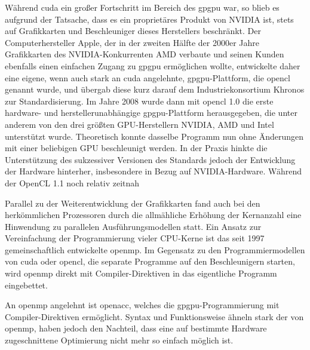 Während \gls{cuda} ein großer Fortschritt im Bereich des \gls{gpgpu} war, so blieb es aufgrund der Tatsache, dass es
ein proprietäres Produkt von NVIDIA{\textregistered} ist, stets auf Grafikkarten und Beschleuniger dieses Herstellers
beschränkt. Der Computerhersteller Apple{\textregistered}, der in der zweiten Hälfte der 2000er Jahre Grafikkarten des
NVIDIA{\textregistered}-Konkurrenten AMD verbaute und seinen Kunden ebenfalls einen einfachen Zugang zu
\gls{gpgpu} ermöglichen wollte, entwickelte daher eine eigene, wenn auch stark an \gls{cuda} angelehnte,
\gls{gpgpu}-Plattform, die \gls{opencl} genannt wurde, und übergab diese kurz darauf dem Industriekonsortium Khronos zur
Standardisierung. Im Jahre 2008 wurde dann mit \gls{opencl} 1.0 die erste hardware- und herstellerunabhängige
\gls{gpgpu}-Plattform herausgegeben, die unter anderem von den drei größten GPU-Herstellern NVIDIA{\textregistered},
AMD und Intel{\textregistered} unterstützt wurde. Theoretisch konnte dasselbe Programm nun ohne Änderungen mit einer
beliebigen GPU beschleunigt werden. In der Praxis hinkte die Unterstützung des sukzessiver Versionen des Standards
jedoch der Entwicklung der Hardware hinterher, insbesondere in Bezug auf NVIDIA{\textregistered}-Hardware. Während der 
OpenCL 1.1 noch relativ zeitnah 

Parallel zu der Weiterentwicklung der Grafikkarten fand auch bei den herkömmlichen Prozessoren durch die allmähliche
Erhöhung der Kernanzahl eine Hinwendung zu parallelen Ausführungsmodellen statt. Ein Ansatz zur Vereinfachung der
Programmierung vieler CPU-Kerne ist das seit 1997 gemeinschaftlich entwickelte \gls{openmp}. Im Gegensatz zu den
Programmiermodellen von \gls{cuda} oder \gls{opencl}, die separate Programme auf den Beschleunigern starten, wird
\gls{openmp} direkt mit Compiler-Direktiven in das eigentliche Programm eingebettet.

An \gls{openmp} angelehnt ist \gls{openacc}, welches die \gls{gpgpu}-Programmierung mit Compiler-Direktiven
ermöglicht. Syntax und Funktionsweise ähneln stark der von \gls{openmp}, haben jedoch den Nachteil, dass eine auf
bestimmte Hardware zugeschnittene Optimierung nicht mehr so einfach möglich ist.
